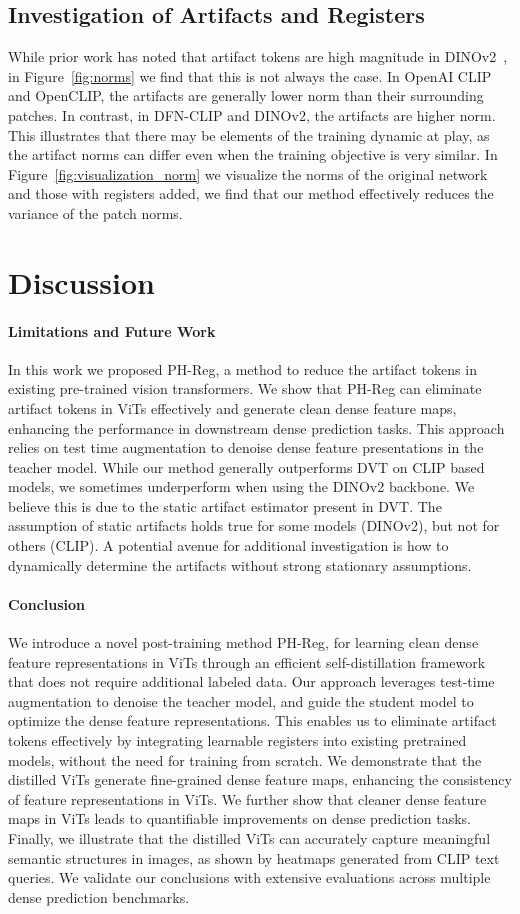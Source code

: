 \documentclass{article}
\newcommand{\myparagraph}[1]{\vspace{-2pt}\paragraph{#1}}
\begin{document}
\subsection{Investigation of Artifacts and Registers}
While prior work has noted that artifact tokens are high magnitude in DINOv2~\cite{darcet2023vision}, in Figure~\ref{fig:norms} we find that this is not always the case. In OpenAI CLIP and OpenCLIP, the artifacts are generally lower norm than their surrounding patches. In contrast, in DFN-CLIP and DINOv2, the artifacts are higher norm. This illustrates that there may be elements of the training dynamic at play, as the artifact norms can differ even when the training objective is very similar. In Figure~\ref{fig:visualization_norm} we visualize the norms of the original network and those with registers added, we find that our method effectively reduces the variance of the patch norms.  \vspace{-.2cm}
\section{Discussion}
\myparagraph{Limitations and Future Work} In this work we proposed PH-Reg, a method to reduce the artifact tokens in existing pre-trained vision transformers. We show that PH-Reg can eliminate artifact tokens in ViTs effectively and generate clean dense feature maps, enhancing the performance in downstream dense prediction tasks. This approach relies on test time augmentation to denoise dense feature presentations in the teacher model. While our method generally outperforms DVT on CLIP based models, we sometimes underperform when using the DINOv2 backbone. We believe this is due to the static artifact estimator present in DVT. The assumption of static artifacts holds true for some models (DINOv2), but not for others (CLIP). A potential avenue for additional investigation is how to dynamically determine the artifacts without strong stationary assumptions. 
\myparagraph{Conclusion}
We introduce a novel post-training method PH-Reg, for learning clean dense feature representations in ViTs through an efficient self-distillation framework that does not require additional labeled data. Our approach leverages test-time augmentation to denoise the teacher model, and guide the student model to optimize the dense feature representations.
This enables us to eliminate artifact tokens effectively by integrating learnable registers into existing pretrained models, without the need for training from scratch.
We demonstrate that the distilled ViTs generate fine-grained dense feature maps, enhancing the consistency of feature representations in ViTs. 
We further show that cleaner dense feature maps in ViTs leads to quantifiable improvements on dense prediction tasks. 
Finally, we illustrate that the distilled ViTs can accurately capture meaningful semantic structures in images, as shown by heatmaps generated from CLIP text queries.
We validate our conclusions with extensive evaluations across multiple dense prediction benchmarks.
\end{document}
